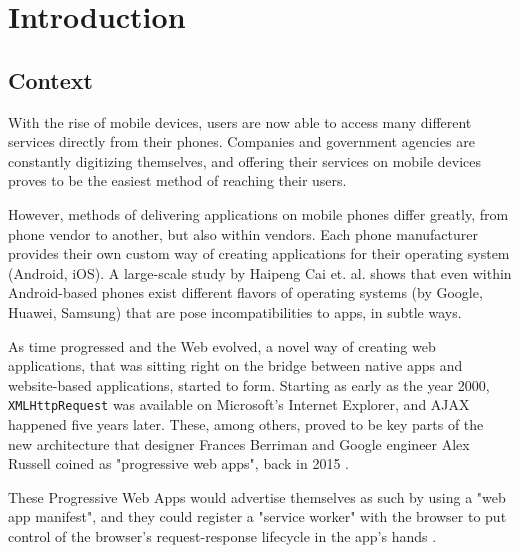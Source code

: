 \chapter{Introduction}


\section{Context}

With the rise of mobile devices, users are now able to access many different services directly from their phones. Companies and government agencies are constantly digitizing themselves, and offering their services on mobile devices proves to be the easiest method of reaching their users.

However, methods of delivering applications on mobile phones differ greatly, from phone vendor to another, but also within vendors. Each phone manufacturer provides their own custom way of creating applications for their operating system (Android, iOS). A large-scale study by Haipeng Cai et. al. shows \cite{HaipengAndroidIncomp} that even within Android-based phones exist different flavors of operating systems (by Google, Huawei, Samsung) that are pose incompatibilities to apps, in subtle ways.

As time progressed and the Web evolved, a novel way of creating web applications, that was sitting right on the bridge between native apps and website-based applications, started to form. Starting as early as the year 2000, \verb|XMLHttpRequest| was available on Microsoft's Internet Explorer, and AJAX happened five years later. These, among others, proved to be key parts of the new architecture that designer Frances Berriman and Google engineer Alex Russell coined as "progressive web apps", back in 2015 \cite{PWAShortHist}.

These Progressive Web Apps would advertise themselves as such by using a "web app manifest", and they could register a "service worker" with the browser to put control of the browser's request-response lifecycle in the app's hands \cite{WHATWGWorkers}.

